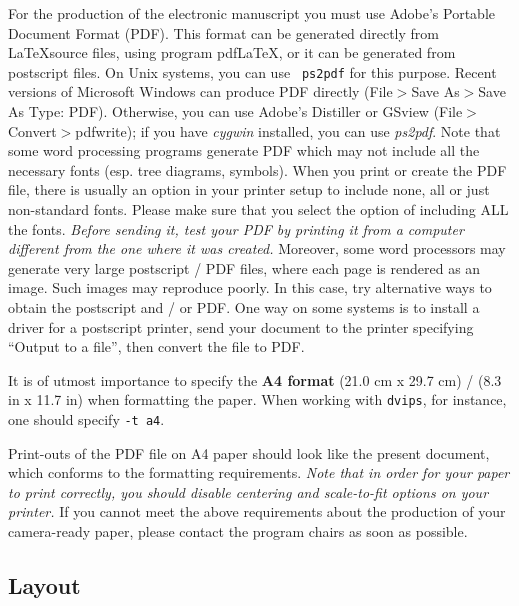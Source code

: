 \documentclass[]{article}
\begin{document}
For the production of the electronic manuscript you must use Adobe's
Portable Document Format (PDF). This format can be generated directly
from \LaTeX source files, using program pdf\LaTeX, or it can be
generated from postscript files. On Unix systems, you can use {\tt
  ps2pdf} for this purpose.  Recent versions of Microsoft Windows can
produce PDF directly (File$>$Save As$>$Save As Type: PDF). Otherwise,
you can use Adobe's Distiller or GSview (File$>$Convert$>$pdfwrite);
if you have \textit{cygwin} installed, you can use
\textit{ps2pdf}. Note that some word processing programs generate PDF
which may not include all the necessary fonts (esp. tree diagrams,
symbols). When you print or create the PDF file, there is usually an
option in your printer setup to include none, all or just non-standard
fonts.  Please make sure that you select the option of including ALL
the fonts. {\em Before sending it, test your PDF by printing it from a
  computer different from the one where it was created.} Moreover,
some word processors may generate very large postscript / PDF files,
where each page is rendered as an image. Such images may reproduce
poorly. In this case, try alternative ways to obtain the postscript
and / or PDF. One way on some systems is to install a driver for a
postscript printer, send your document to the printer specifying
``Output to a file'', then convert the file to PDF.


It is of utmost importance to specify the \textbf{A4 format} (21.0 cm
x 29.7 cm) / (8.3 in x 11.7 in) when formatting the paper. When working with
{\tt dvips}, for instance, one should specify {\tt -t a4}.

Print-outs of the PDF file on A4 paper should look like the
present document, which conforms to the formatting requirements. {\em
  Note that in order for your paper to print correctly, you should
  disable centering and scale-to-fit options on your printer.} If you
cannot meet the above requirements about the production of your
camera-ready paper, please contact the program chairs as soon as
possible.


\subsection{Layout}
\label{ssec:layout}
\end{document}
